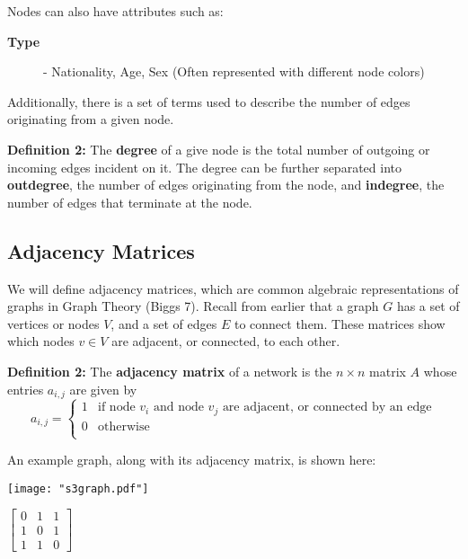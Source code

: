 \documentclass{article}
\begin{document}
\bigskip

\noindent Nodes can also have attributes such as:
\bigskip
\begin{description}
  \item[\textbf{Type}] - Nationality, Age, Sex (Often represented with different node colors)
\end{description}
\bigskip

Additionally, there is a set of terms used to describe the number of edges originating from a given node.

\bigskip

\textbf{Definition 2:} The \textbf{degree} of a give node is the total number of outgoing or incoming edges incident on it. 
The degree can be further separated into \textbf{outdegree}, the number of edges originating from the node, and \textbf{indegree},
the number of edges that terminate at the node.

\subsection{Adjacency Matrices}
We will define adjacency matrices, which are common algebraic representations of graphs in Graph Theory (Biggs 7).
Recall from earlier that a graph $G$ has a set of vertices or nodes $V$, and a set of edges $E$ to connect them.
These matrices show which nodes $v \in V$ are adjacent, or connected, to each other.

\bigskip

\textbf{Definition 2:} The \textbf{adjacency matrix} of a network is the $n \times n$ matrix $A$ whose entries $a_{i,j}$ are given by
\[   
a_{i,j} = 
     \begin{cases}
       1 & \text{if node } v_i \text{ and node } v_j \text{ are adjacent, or connected by an edge} \\
       0 & \text{otherwise} \\
     \end{cases}
\]

\bigskip

An example graph, along with its adjacency matrix, is shown here:

\bigskip

\noindent\begin{minipage}{.5\textwidth}
\centering
\texttt{[image: "s3graph.pdf"]}
\label{fig:fig1}            
\end{minipage}%
\begin{minipage}{.5\textwidth}
\centering
\vspace{1.2cm}
$\begin{bmatrix}
0 & 1 & 1\\
1 & 0 & 1\\
1 & 1 & 0
\end{bmatrix}$
\vspace{1.1cm}

\label{fig:fig2}            
\end{minipage}
\end{document}
